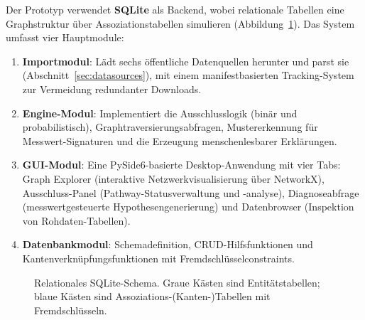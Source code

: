 \documentclass[12pt,a4paper]{article}
\begin{document}
Der Prototyp verwendet \textbf{SQLite} als Backend, wobei relationale Tabellen eine Graphstruktur über Assoziationstabellen simulieren (Abbildung~\ref{fig:schema_sql}). Das System umfasst vier Hauptmodule:

\begin{enumerate}
    \item \textbf{Importmodul}: Lädt sechs öffentliche Datenquellen herunter und parst sie (Abschnitt~\ref{sec:datasources}), mit einem manifestbasierten Tracking-System zur Vermeidung redundanter Downloads.
    \item \textbf{Engine-Modul}: Implementiert die Ausschlusslogik (binär und probabilistisch), Graphtraversierungsabfragen, Mustererkennung für Messwert-Signaturen und die Erzeugung menschenlesbarer Erklärungen.
    \item \textbf{GUI-Modul}: Eine PySide6-basierte Desktop-Anwendung mit vier Tabs: Graph Explorer (interaktive Netzwerkvisualisierung über NetworkX), Ausschluss-Panel (Pathway-Statusverwaltung und -analyse), Diagnoseabfrage (messwertgesteuerte Hypothesengenerierung) und Datenbrowser (Inspektion von Rohdaten-Tabellen).
    \item \textbf{Datenbankmodul}: Schemadefinition, CRUD-Hilfsfunktionen und Kantenverknüpfungsfunktionen mit Fremdschlüsselconstraints.
\end{enumerate}

\begin{figure}[H]
\centering
{}
\caption{Relationales SQLite-Schema. Graue Kästen sind Entitätstabellen; blaue Kästen sind Assoziations-(Kanten-)Tabellen mit Fremdschlüsseln.}
\label{fig:schema_sql}
\end{figure}
\end{document}

